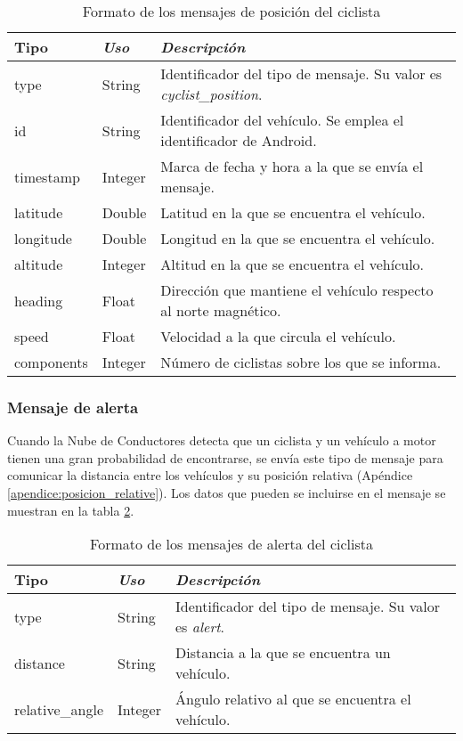 \begin{table}[h]
	\centering
	\caption{Formato de los mensajes de posición del ciclista}
	\label{tab:CamposMensajePosCiclistaNubeConductores}
	\begin{tabular}{lll}
		\toprule
			\textbf{Tipo} & \emph{Uso} & \emph{Descripción}\\
		\midrule
			type			&	String	&	Identificador del tipo de mensaje. Su valor es
														\emph{cyclist\_position}.	\\
			id				&	String	&	Identificador del vehículo. Se emplea el
														identificador de Android.		\\
			timestamp	&	Integer	&	Marca de fecha y hora a la que se envía el mensaje.	\\
			latitude	&	Double	&	Latitud en la que se encuentra el vehículo.	\\
			longitude	&	Double	&	Longitud en la que se encuentra el vehículo.\\
			altitude	&	Integer	&	Altitud en la que se encuentra el vehículo.	\\
			heading		&	Float		&	Dirección que mantiene el vehículo respecto al
														norte magnético.\\
			speed			&	Float		&	Velocidad a la que circula el vehículo.	\\
			components 	&	Integer	&	Número de ciclistas sobre los que se informa. \\
		\bottomrule
	\end{tabular}
\end{table}
\FloatBarrier
\subsubsection{Mensaje de alerta}\label{sssection:MensajeAlerta}
Cuando la Nube de Conductores detecta que un ciclista y un vehículo a
motor tienen una gran probabilidad de encontrarse, se envía este tipo de
mensaje para comunicar la distancia entre los vehículos y su posición relativa
(Apéndice \ref{apendice:posicion_relative}). Los datos que pueden se incluirse
en el mensaje se muestran en la tabla
\ref{tab:CamposMensajeAlertaCiclistaNubeConductores}.

\begin{table}[h]
	\centering
	\caption{Formato de los mensajes de alerta del ciclista}
	\label{tab:CamposMensajeAlertaCiclistaNubeConductores}
	\begin{tabular}{lll}
		\toprule
			\textbf{Tipo} & \emph{Uso} & \emph{Descripción}\\
		\midrule
			type						&	String	&	Identificador del tipo de mensaje. Su valor es
														\emph{alert}.	\\
			distance				&	String	&	Distancia a la que se encuentra un vehículo.\\
			relative\_angle	&	Integer	&	Ángulo relativo al que se encuentra
											el vehículo.\\
		\bottomrule
	\end{tabular}
\end{table}
